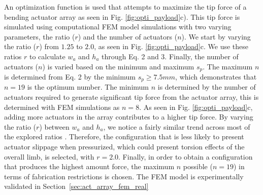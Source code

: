 \documentclass[letterpaper, 10 pt, conference]{ieeeconf}  %
\begin{document}
An optimization function is used that attempts to maximize the tip force of a bending actuator array as seen in Fig. \ref{fig:opti_payload}c). This tip force is simulated using computational FEM model simulations with two varying parameters, the ratio ($r$) and the number of actuators ($n$). We start by varying the ratio ($r$) from $1.25$ to $2.0$, as seen in Fig. \ref{fig:opti_payload}c. We use these ratios $r$ to calculate $w_a$ and $h_a$ through Eq. 2 and 3. Finally, the number of actuators ($n$) is varied based on the minimum and maximum $s_p$. The maximum $n$ is determined from Eq. 2 by the minimum $s_p \geq 7.5mm$, which demonstrates that $n = 19$ is the optimum number.  The minimum $n$ is determined by the number of actuators required to generate significant tip force from the actuator array, this is determined with FEM simulations as $n = 8$. As seen in Fig. \ref{fig:opti_payload}c, adding more actuators in the array contributes to a higher tip force. By varying the ratio ($r$) between $w_a$ and $h_a$, we notice a fairly similar trend across most of the explored ratios . Therefore, the configuration that is less likely to present actuator slippage when pressurized, which could present torsion effects of the overall limb, is selected, with $r =2.0$. Finally, in order to obtain a configuration that produces the highest amount force, the maximum $n$ possible ($n = 19$) in terms of fabrication restrictions is chosen. The FEM model is experimentally validated in Section~\ref{sec:act_array_fem_real}
% 
% 
% 
% 
% 
% 
% 
% 
% 
% 
\end{document}
